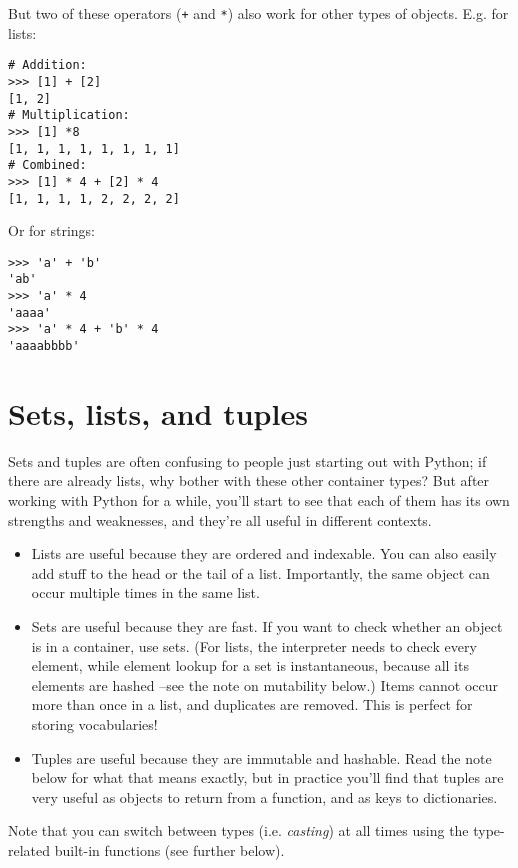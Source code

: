 \documentclass[12pt]{book}
\begin{document}
\noindent But two of these operators (\texttt{+} and \texttt{*}) also work for other types of objects. E.g. for lists:

\begin{lstlisting}
# Addition:
>>> [1] + [2]
[1, 2]
# Multiplication:
>>> [1] *8
[1, 1, 1, 1, 1, 1, 1, 1]
# Combined:
>>> [1] * 4 + [2] * 4
[1, 1, 1, 1, 2, 2, 2, 2]
\end{lstlisting}

Or for strings:

\begin{lstlisting}
>>> 'a' + 'b'
'ab'
>>> 'a' * 4
'aaaa'
>>> 'a' * 4 + 'b' * 4
'aaaabbbb'
\end{lstlisting}

\section{Sets, lists, and tuples}
Sets and tuples are often confusing to people just starting out with Python; if
there are already lists, why bother with these other container types? But after
working with Python for a while, you'll start to see that each of them has its own
strengths and weaknesses, and they're all useful in different contexts.

\begin{itemize}
\item Lists are useful because they are ordered and indexable. You can also
  easily add stuff to the head or the tail of a list. Importantly, the
  same object can occur multiple times in the same list.
\item Sets are useful because they are fast. If you want to check whether an
  object is in a container, use sets. (For lists, the interpreter needs
  to check every element, while element lookup for a set is
  instantaneous, because all its elements are hashed --see the note on
  mutability below.) Items cannot occur more than once in a list, and
  duplicates are removed. This is perfect for storing vocabularies!

\item Tuples are useful because they are immutable and hashable. Read the
  note below for what that means exactly, but in practice you'll find
  that tuples are very useful as objects to return from a function, and
  as keys to dictionaries.
\end{itemize}

Note that you can switch between types (i.e. \emph{casting}) at all times using the type-related built-in functions (see further below).
\end{document}
